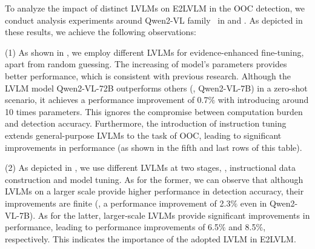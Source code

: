 To analyze the impact of distinct LVLMs on E2LVLM in the OOC detection, we conduct analysis experiments around Qwen2-VL family~\cite{wang2024qwen2} in  and . As depicted in these results, we achieve the following observations:




(1) As shown in , we employ different LVLMs for evidence-enhanced fine-tuning, apart from random guessing. The increasing of model's parameters provides better performance, which is consistent with previous research. Although the LVLM model Qwen2-VL-72B outperforms others (\eg, Qwen2-VL-7B) in a zero-shot scenario, it achieves a performance improvement of 0.7$\%$ with introducing around 10 times parameters. This ignores the compromise between computation burden and detection accuracy. Furthermore, the introduction of instruction tuning extends general-purpose LVLMs to the task of OOC, leading to significant improvements in performance (as shown in the fifth and last rows of this table).

(2) As depicted in , we use different LVLMs at two stages, \ie, instructional data construction and model tuning. As for the former, we can observe that although LVLMs on a larger scale provide higher performance in detection accuracy, their improvements are finite (\eg, a performance improvement of 2.3$\%$ even in Qwen2-VL-7B). As for the latter, larger-scale LVLMs provide significant improvements in performance, leading to performance improvements of 6.5$\%$ and 8.5$\%$, respectively. This indicates the importance of the adopted LVLM in E2LVLM.